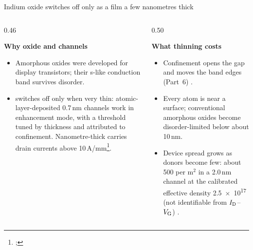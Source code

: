 \begin{frame}{Indium oxide switches off only as a film a few nanometres thick}
  \oneTop
  \begin{columns}[T,onlytextwidth]
    \begin{column}{0.46\textwidth}
      {\small\textbf{Why oxide and \InO{} channels}\par}
      \begin{itemize}
        \item Amorphous oxides were developed for display transistors; their s-like conduction band survives
          disorder.
        \item \InO{} switches off only when very thin: atomic-layer-deposited 0.7\,nm channels work in enhancement mode,
          with a threshold tuned by thickness and attributed to confinement. Nanometre-thick \InO{} carries drain
          currents above 10\,A/mm\footnote[frame]{; }.
      \end{itemize}
    \end{column}
    \begin{column}{0.50\textwidth}
      {\small\textbf{What thinning costs}\par}
      \begin{itemize}
        \item Confinement opens the gap and moves the band edges (Part~6) .
        \item Every atom is near a surface; conventional amorphous oxides become disorder-limited below about
          10\,nm.
        \item Device spread grows as donors become few: about 500 per \textmu m$^{2}$ in a 2.0\,nm channel at the
          calibrated effective density \num{2.5e17}\cmcu{} (not identifiable from $I_{\mathrm{D}}$--$V_{\mathrm{G}}$) .
      \end{itemize}
    \end{column}
  \end{columns}
\end{frame}

